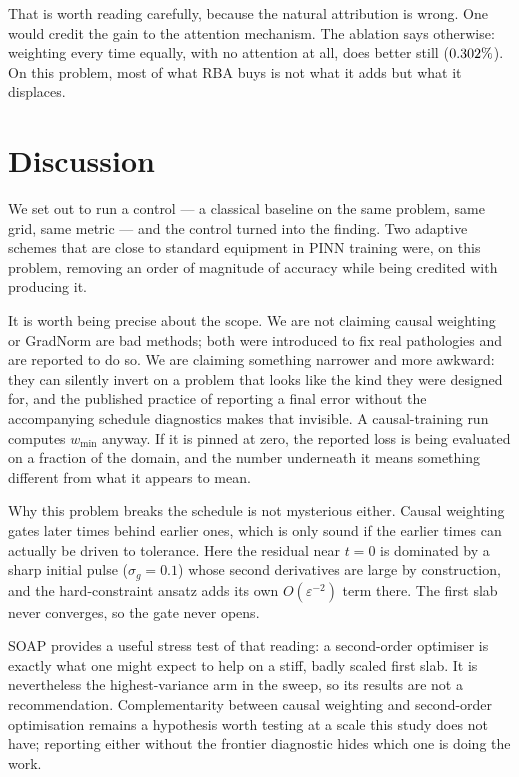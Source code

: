 That is worth reading carefully, because the natural attribution is wrong. One
would credit the gain to the attention mechanism. The ablation says otherwise:
weighting every time equally, with no attention at all, does better still
($0.302\%$). On this problem, most of what RBA buys is not what it adds
but what it displaces.


\section{Discussion}
\label{sec:discussion}

We set out to run a control --- a classical baseline on the same problem, same
grid, same metric --- and the control turned into the finding. Two adaptive
schemes that are close to standard equipment in PINN training were, on this
problem, removing an order of magnitude of accuracy while being credited with
producing it.

It is worth being precise about the scope. We are not claiming causal weighting
or GradNorm are bad methods; both were introduced to fix real pathologies and
are reported to do so. We are claiming something narrower and more awkward:
they can silently invert on a problem that looks like the kind they were
designed for, and the published practice of reporting a final error without the
accompanying schedule diagnostics makes that invisible. A causal-training run
computes $w_{\min}$ anyway. If it is pinned at zero, the reported loss is being
evaluated on a fraction of the domain, and the number underneath it means
something different from what it appears to mean.

Why this problem breaks the schedule is not mysterious either. Causal weighting
gates later times behind earlier ones, which is only sound if the earlier times
can actually be driven to tolerance. Here the residual near $t = 0$ is
dominated by a sharp initial pulse ($\sigma_g = 0.1$) whose second derivatives
are large by construction, and the hard-constraint ansatz adds its own
$O(\varepsilon^{-2})$ term there. The first slab never converges, so the gate
never opens.

SOAP provides a useful stress test of that reading: a second-order optimiser is
exactly what one might expect to help on a stiff, badly scaled first slab. It is
nevertheless the highest-variance arm in the sweep, so its results are not a
recommendation. Complementarity between causal weighting and
second-order optimisation remains a hypothesis worth testing at a scale this
study does not have; reporting either without the frontier diagnostic hides
which one is doing the work.

